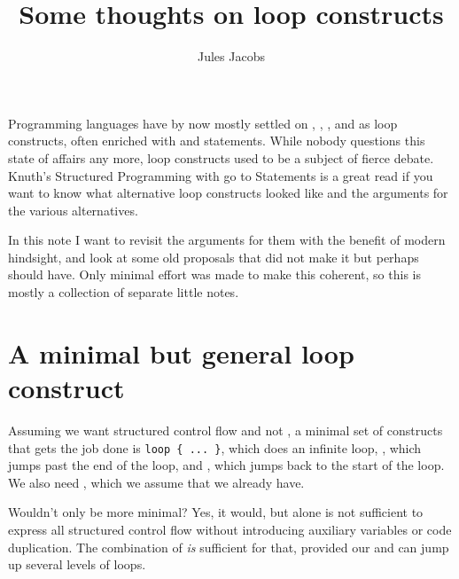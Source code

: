 

\newcommand{\tac}[1]{\lstinline[mathescape]~#1~}
\newcommand{\ciff}{\ \leftrightarrow\ }
\newcommand{\hyp}{\tac{H}}
\newcommand{\hypB}{\tac{G}}
\newcommand{\var}{\tac{x}}
\newcommand{\varB}{\tac{y}}

\newtheorem*{nlemma}{Lemma}

\DeclareMathOperator*{\tr}{tr}



\title{Some thoughts on loop constructs}
\author{Jules Jacobs}


\maketitle

Programming languages have by now mostly settled on , , , and  as loop constructs, often enriched with  and  statements. While nobody questions this state of affairs any more, loop constructs used to be a subject of fierce debate. Knuth's Structured Programming with go to Statements \cite{knuthgoto} is a great read if you want to know what alternative loop constructs looked like and the arguments for the various alternatives.

In this note I want to revisit the arguments for them with the benefit of modern hindsight, and look at some old proposals that did not make it but perhaps should have.
Only minimal effort was made to make this coherent, so this is mostly a collection of separate little notes.

\section{A minimal but general loop construct}

Assuming we want structured control flow and not , a minimal set of constructs that gets the job done is \lstinline|loop { ... }|, which does an infinite loop, , which jumps past the end of the loop, and , which jumps back to the start of the loop. We also need , which we assume that we already have.

Wouldn't only  be more minimal? Yes, it would, but  alone is not sufficient to express all structured control flow without introducing auxiliary variables or code duplication. The combination of  \emph{is} sufficient for that, provided our  and  can jump up several levels of loops.

